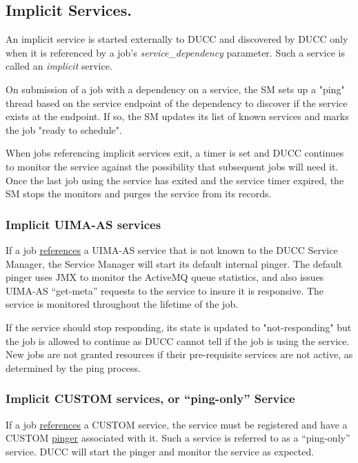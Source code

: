       \subsection{Implicit Services.} 
      \label{sec:services.implicit}
      An implicit service is started externally to DUCC and discovered by DUCC only when it is
      referenced by a job's {\em service\_dependency} parameter.  Such a service is called
      an {\em implicit} service.

      On submission of a job with a dependency on a service, the SM sets up a "ping" thread based on the
      service endpoint of the dependency to discover if the service exists at the endpoint. If so,
      the SM updates its list of known services and marks the job "ready to schedule".

      When jobs referencing implicit services exit, a timer is set and DUCC continues to monitor the
      service against the possibility that subsequent jobs will need it. Once the last job using the
      service has exited and the service timer expired, the SM stops the monitors and purges the
      service from its records.

      \subsubsection{Implicit UIMA-AS services}
      If a job \hyperref[sec:service.endpoints]{references} a UIMA-AS service that is not known to the
      DUCC Service Manager, the Service Manager will start
      its default internal pinger.  The default pinger uses JMX to monitor the ActiveMQ queue statistics,
      and also issues UIMA-AS ``get-meta'' requests to the service to insure it is responsive.  The
      service is monitored throughout the lifetime of the job. 

      If the service should stop
      responding, its state is updated to "not-responding" but the job is allowed to continue as
      DUCC cannot tell if the job is using the service.  New jobs are not granted resources if
      their pre-requisite services are not active, as determined by the ping process.

      \subsubsection{Implicit CUSTOM services, or ``ping-only'' Service} 
      If a job \hyperref[sec:service.endpoints]{references} a CUSTOM service, the service must be
      registered and have a CUSTOM \hyperref[sec:service.pingers]{pinger} associated with it. Such a
      service is referred to as a ``ping-only'' service.  DUCC will start the pinger and monitor the
      service as expected.  

